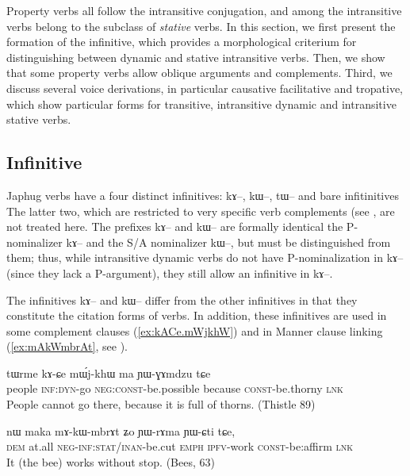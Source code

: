 \documentclass[oldfontcommands,oneside,a4paper,11pt]{article}
\newcommand{\ipa}[1]{{\phon \mbox{#1}}} %
\begin{document}
Property verbs all follow the intransitive conjugation, and among the intransitive verbs belong to the subclass of \textit{stative} verbs. In this section, we first present the formation of the infinitive, which provides a morphological criterium for distinguishing between dynamic and stative intransitive verbs. Then, we show that some property verbs allow oblique arguments and complements. Third, we discuss several voice derivations, in particular causative facilitative and tropative, which show particular forms for transitive, intransitive dynamic and intransitive stative verbs.


\subsection{Infinitive} \label{sec:infinitive}
Japhug verbs have a   four distinct infinitives: \ipa{kɤ--}, \ipa{kɯ--}, \ipa{tɯ--} and bare infitinitives The latter two, which are restricted to very specific verb complements (see \citealt{jacques14antipassive}, are not treated here. The prefixes \ipa{kɤ--} and \ipa{kɯ--} are formally identical the P-nominalizer \ipa{kɤ--} and the S/A nominalizer \ipa{kɯ--}, but must be distinguished from them; thus, while intransitive dynamic verbs do not have P-nominalization in \ipa{kɤ--} (since they lack a P-argument), they still allow an infinitive in \ipa{kɤ--}.

The infinitives \ipa{kɤ--} and \ipa{kɯ--} differ from the other infinitives in that they constitute the citation forms of verbs. In addition, these infinitives are used in some complement clauses (\ref{ex:kACe.mWjkhW}) and in Manner clause linking (\ref{ex:mAkWmbrAt}, see \citealt{jacques14linking}).

\begin{exe}
\ex \label{ex:kACe.mWjkhW}
\gll
\ipa{tɯrme} 	\ipa{kɤ-ɕe} 	\ipa{mɯ́j-khɯ} 	\ipa{ma} 	\ipa{ɲɯ-ɣɤmdzu} 	\ipa{tɕe} \\
people \textsc{inf:dyn}-go \textsc{neg:const}-be.possible because \textsc{const}-be.thorny \textsc{lnk} \\
\glt People cannot go there, because it is full of thorns. (Thistle 89)
\end{exe}

\begin{exe}
\ex \label{ex:mAkWmbrAt}
\gll
\ipa{nɯ} 	\ipa{maka} 	\ipa{mɤ-kɯ-mbrɤt} 	\ipa{ʑo} 	\ipa{ɲɯ-rɤma} 	\ipa{ɲɯ-ɕti} 	\ipa{tɕe,} 	\\
\textsc{dem} at.all \textsc{neg-inf:stat/inan}-be.cut \textsc{emph} \textsc{ipfv}-work \textsc{const}-be:affirm \textsc{lnk} \\
\glt It (the bee) works without stop. (Bees, 63)
\end{exe}
\end{document}
